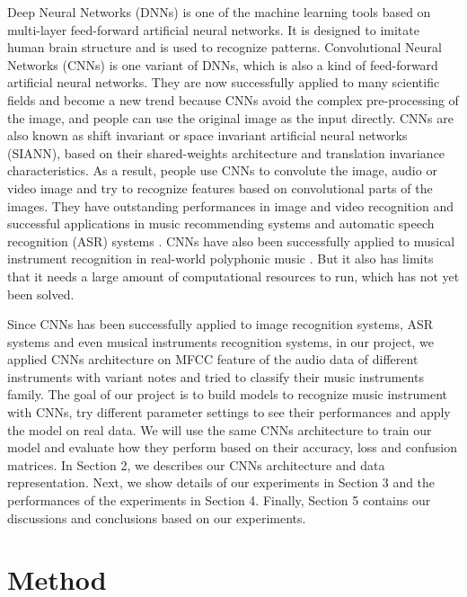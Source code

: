 \documentclass{article}
\begin{document}
Deep Neural Networks (DNNs) is one of the machine learning tools based on multi-layer feed-forward artificial neural networks. It is designed to imitate human brain structure and is used to recognize patterns. Convolutional Neural Networks (CNNs) is one variant of DNNs, which is also a kind of feed-forward artificial neural networks. They are now successfully applied to many scientific fields and become a new trend because CNNs avoid the complex pre-processing of the image, and people can use the original image as the input directly. CNNs are also known as shift invariant or space invariant artificial neural networks (SIANN), based on their shared-weights architecture and translation invariance characteristics.\cite{zhang} As a result, people use CNNs to convolute the image, audio or video image and try to recognize features based on convolutional parts of the images. They have outstanding performances in image and video recognition \cite{krizhevsky} and successful applications in music recommending systems \cite{vanden} and automatic speech recognition (ASR) systems \cite{abdelhamid}. CNNs have also been successfully applied to musical instrument recognition in real-world polyphonic music \cite{yoonchang}. But it also has limits that it needs a large amount of computational resources to run, which has not yet been solved.

Since CNNs has been successfully applied to image recognition systems, ASR systems and even musical instruments recognition systems, in our project, we applied CNNs architecture on MFCC feature of the audio data of different instruments with variant notes and tried to classify their music instruments family. The goal of our project is to build models to recognize music instrument with CNNs, try different parameter settings to see their performances and apply the model on real data. We will use the same CNNs architecture to train our model and evaluate how they perform based on their accuracy, loss and confusion matrices. In Section 2, we describes our CNNs architecture and data representation. Next, we show details of our experiments in Section 3 and the performances of the experiments in Section 4. Finally, Section 5 contains our discussions and conclusions based on our experiments.


\section{Method}
\end{document}
